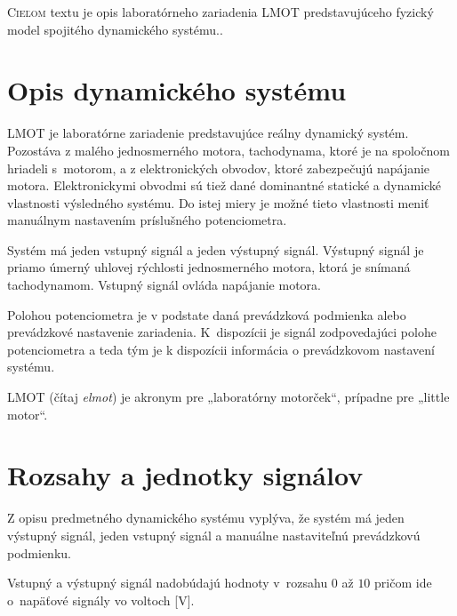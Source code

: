 \documentclass[a4paper, 10pt, ]{article}
\begin{document}
\bigskip

\normalsize
\normalfont

\lstset{style=mystyle}










\noindent
\lettrine[lines=1, nindent=1pt, loversize=0.0]{C}{ieľom} 
textu je opis laboratórneho zariadenia LMOT predstavujúceho fyzický model spojitého dynamického systému..


\section{Opis dynamického systému}

LMOT je laboratórne zariadenie predstavujúce reálny dynamický systém. Pozostáva z malého jednosmerného motora, tachodynama, ktoré je na spoločnom hriadeli s~motorom, a z elektronických obvodov, ktoré zabezpečujú napájanie motora. Elektronickymi obvodmi sú tiež dané dominantné statické a dynamické vlastnosti výsledného systému. Do istej miery je možné tieto vlastnosti meniť manuálnym nastavením príslušného potenciometra.

Systém má jeden vstupný signál a jeden výstupný signál. Výstupný signál je priamo úmerný uhlovej rýchlosti jednosmerného motora, ktorá je snímaná tachodynamom. Vstupný signál ovláda napájanie motora.

Polohou potenciometra je v podstate daná prevádzková podmienka alebo prevádzkové nastavenie zariadenia. K~dispozícii je signál zodpovedajúci polohe potenciometra a teda tým je k dispozícii informácia o prevádzkovom nastavení systému.

LMOT (čítaj \emph{elmot}) je akronym pre „laboratórny motorček“, prípadne pre „little motor“.





\section{Rozsahy a jednotky signálov}

Z opisu predmetného dynamického systému vyplýva, že systém má jeden výstupný signál, jeden vstupný signál a manuálne nastaviteľnú prevádzkovú podmienku.

Vstupný a výstupný signál nadobúdajú hodnoty v~rozsahu $0$ až $10$ pričom ide o~napäťové signály vo voltoch [V].
\end{document}

